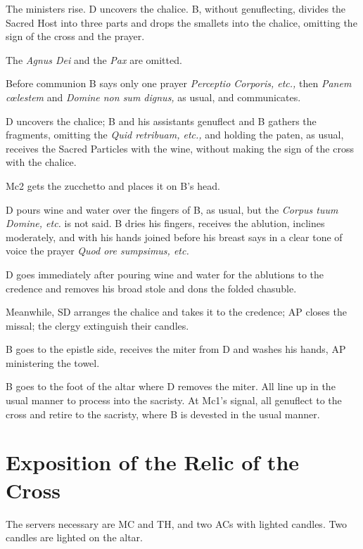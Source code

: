 {    \rubric The ministers rise. D uncovers the chalice. B, without
    genuflecting, divides the Sacred Host into three parts and drops the
    smallets into the chalice, omitting the sign of the cross and the prayer.

    \rubric The \textit{Agnus Dei} and the \textit{Pax} are omitted.

    \rubric Before communion B says only one prayer \textit{Perceptio Corporis,
    etc.,} then \textit{Panem cœlestem} and \textit{Domine non sum dignus,} as
    usual, and communicates.

    \rubric D uncovers the chalice; B and his assistants genuflect and B
    gathers the fragments, omitting the \textit{Quid retribuam, etc.,} and
    holding the paten, as usual, receives the Sacred Particles with the wine,
    without making the sign of the cross with the chalice.

    \rubric Mc2 gets the zucchetto and places it on B's head.

    \rubric D pours wine and water over the fingers of B, as usual, but the
    \textit{Corpus tuum Domine, etc.} is not said. B dries his fingers,
    receives the ablution, inclines moderately, and with his hands joined
    before his breast says in a clear tone of voice the prayer \textit{Quod ore
    sumpsimus, etc.}

    \rubric D goes immediately after pouring wine and water for the ablutions
    to the credence and removes his broad stole and dons the folded chasuble.

    \rubric Meanwhile, SD arranges the chalice and takes it to the credence; AP
    closes the missal; the clergy extinguish their candles.

    \rubric B goes to the epistle side, receives the miter from D and washes
    his hands, AP ministering the towel.

    \rubric B goes to the foot of the altar where D removes the miter. All line
    up in the usual manner to process into the sacristy. At Mc1's signal, all
    genuflect to the cross and retire to the sacristy, where B is devested in
    the usual manner.


\section{Exposition of the Relic of the Cross}

    \rubric The servers necessary are MC and TH, and two ACs with lighted
    candles. Two candles are lighted on the altar.

}
